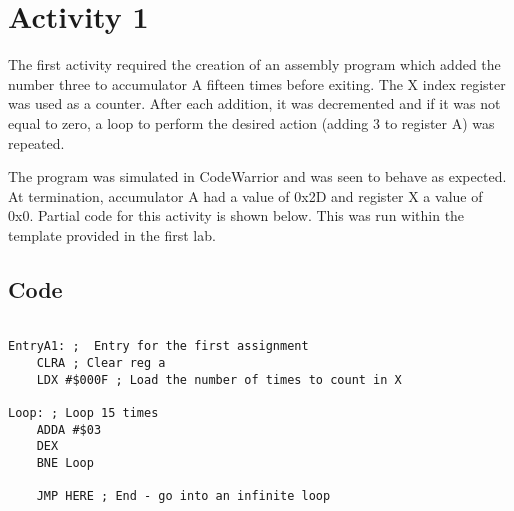 \section{Activity 1}

The first activity required the creation of an assembly program which added the number three to accumulator A fifteen times before exiting.
The X index register was used as a counter.
After each addition, it was decremented and if it was not equal to zero, a loop to perform the desired action (adding 3 to register A) was repeated.

The program was simulated in CodeWarrior and was seen to behave as expected.
At termination, accumulator A had a value of 0x2D and register X a value of 0x0.
Partial code for this activity is shown below.
This was run within the template provided in the first lab.


\subsection{Code}

{\footnotesize
\begin{lstlisting}

EntryA1: ;	Entry for the first assignment
	CLRA ; Clear reg a
	LDX #$000F ; Load the number of times to count in X
	
Loop: ; Loop 15 times
	ADDA #$03 
	DEX
	BNE Loop
	
	JMP HERE ; End - go into an infinite loop
	
\end{lstlisting}
}
